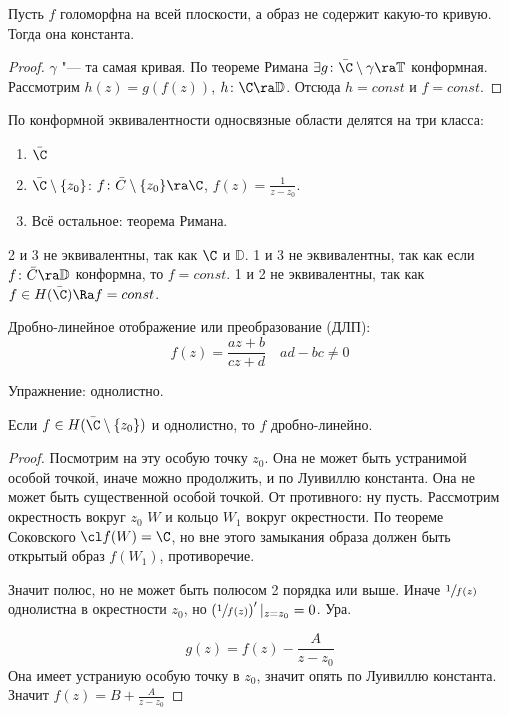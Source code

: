 \TODO

\begin{conseq}
	Пусть $f$ голоморфна на всей плоскости, а образ не содержит какую-то кривую.
	Тогда она константа.
\end{conseq}
\begin{proof}
	$\gamma$ "--- та самая кривая. По теореме Римана $\exists g\colon \bar \C \setminus \gamma \ra \mathbb T$ конформная.
	Рассмотрим $h(z) = g(f(z))$, $h\colon \C \ra \mathbb D$. Отсюда $h = const$ и $f=const$.
\end{proof}

\begin{Rem}
	По конформной эквивалентности односвязные области делятся на три класса:
	\begin{enumerate}
		\item $\bar \C$
		\item $\bar \C \setminus \{z_0\}$: $f\colon \bar C \setminus \{z_0\} \ra \C$, $f(z) = \frac1{z-z_0}$.
		\item Всё остальное: теорема Римана.
	\end{enumerate}
	2 и 3 не эквивалентны, так как $\C$ и $\mathbb D$.
	1 и 3 не эквивалентны, так как если $f\colon \bar C \ra \mathbb D$ конформна, то $f = const$.
	1 и 2 не эквивалентны, так как $f \in H(\bar \C) \Ra f = const$.
\end{Rem}

\begin{Def}
	Дробно-линейное отображение или преобразование (ДЛП):
	\[ f(z) = \frac{az+b}{cz+d} \quad ad-bc \ne 0 \]
\end{Def}

Упражнение: однолистно.

\begin{theorem}
	Если $f \in H(\bar \C \setminus \{z_0\})$ и однолистно, то $f$ дробно-линейно.
\end{theorem}
\begin{proof}
	Посмотрим на эту особую точку $z_0$.
	Она не может быть устранимой особой точкой, иначе можно продолжить, и по Луивиллю константа.
	Она не может быть существенной особой точкой.
	От противного: ну пусть. Рассмотрим окрестность вокруг $z_0$ $W$ и кольцо $W_1$ вокруг окрестности.
	По теореме Соковского $\cl f(W) = \C$, но вне этого замыкания образа должен быть открытый образ $f(W_1)$, противоречие.

	Значит полюс, но не может быть полюсом 2 порядка или выше.
	Иначе $\sfrac 1{f(z)}$ однолистна в окрестности $z_0$, но $\left(\sfrac 1{f(z)}\right)'|_{z=z_0} = 0$.
	Ура.

	\[ g(z) = f(z) - \frac A{z - z_0} \]
	Она имеет устраниую особую точку в $z_0$, значит опять по Луивиллю константа.
	Значит $f(z) = B + \frac A{z-z_0}$
\end{proof}

